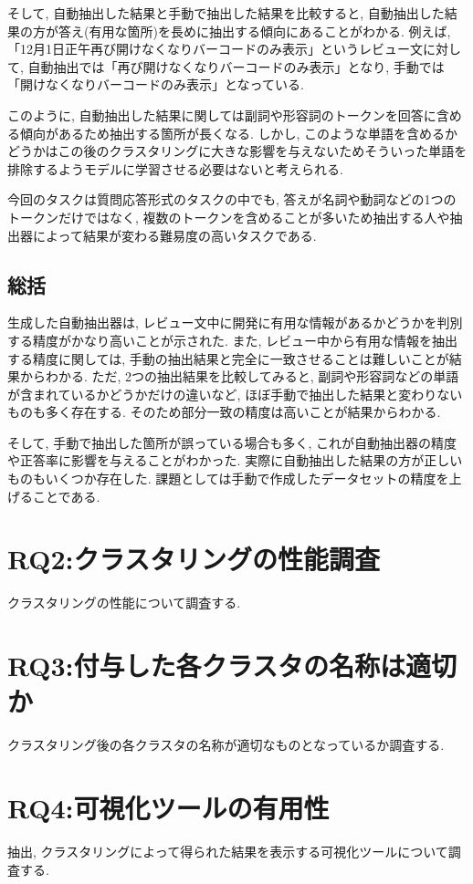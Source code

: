 そして, 自動抽出した結果と手動で抽出した結果を比較すると, 自動抽出した結果の方が答え(有用な箇所)を長めに抽出する傾向にあることがわかる. 
例えば, 「12月1日正午再び開けなくなりバーコードのみ表示」というレビュー文に対して, 自動抽出では「再び開けなくなりバーコードのみ表示」となり, 手動では「開けなくなりバーコードのみ表示」となっている. 

このように, 自動抽出した結果に関しては副詞や形容詞のトークンを回答に含める傾向があるため抽出する箇所が長くなる. しかし, このような単語を含めるかどうかはこの後のクラスタリングに大きな影響を与えないためそういった単語を排除するようモデルに学習させる必要はないと考えられる. 

今回のタスクは質問応答形式のタスクの中でも, 答えが名詞や動詞などの1つのトークンだけではなく, 複数のトークンを含めることが多いため抽出する人や抽出器によって結果が変わる難易度の高いタスクである. 


\subsection{総括}
生成した自動抽出器は, レビュー文中に開発に有用な情報があるかどうかを判別する精度がかなり高いことが示された. 
また, レビュー中から有用な情報を抽出する精度に関しては, 手動の抽出結果と完全に一致させることは難しいことが結果からわかる. ただ, 2つの抽出結果を比較してみると, 副詞や形容詞などの単語が含まれているかどうかだけの違いなど, ほぼ手動で抽出した結果と変わりないものも多く存在する. そのため部分一致の精度は高いことが結果からわかる. 

そして, 手動で抽出した箇所が誤っている場合も多く, これが自動抽出器の精度や正答率に影響を与えることがわかった. 実際に自動抽出した結果の方が正しいものもいくつか存在した. 課題としては手動で作成したデータセットの精度を上げることである. 


\section{RQ2:クラスタリングの性能調査}
クラスタリングの性能について調査する. 


\section{RQ3:付与した各クラスタの名称は適切か}
クラスタリング後の各クラスタの名称が適切なものとなっているか調査する. 


\section{RQ4:可視化ツールの有用性}
抽出, クラスタリングによって得られた結果を表示する可視化ツールについて調査する. 